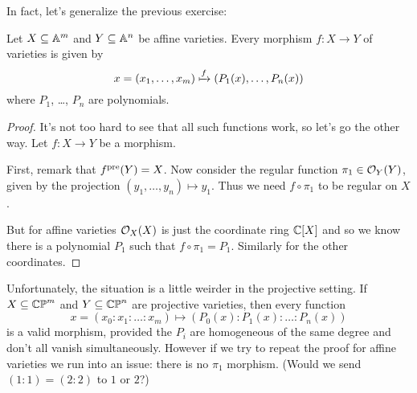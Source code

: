 In fact, let's generalize the previous exercise:
\begin{theorem}
	Let $X \subseteq \mathbb A^m$ and $Y \subseteq \mathbb A^n$ be affine varieties.
	Every morphism $f : X \to Y$ of varieties is given by
	\[
		x = \left( x_1, \dots, x_m \right)
		\xmapsto{f} \left( P_1(x), \dots, P_n(x) \right)
	\]
	where $P_1$, \dots, $P_n$ are polynomials.
	\label{thm:affine_global_polynomial}
\end{theorem}
\begin{proof}
	It's not too hard to see that all such functions work,
	so let's go the other way.
	Let $f : X \to Y$ be a morphism.

	First, remark that $f^{\text{pre}}(Y) = X$.
	Now consider the regular function $\pi_1 \in \mathcal O_Y(Y)$,
	given by the projection $(y_1, \dots, y_n) \mapsto y_1$.
	Thus we need $f \circ \pi_1$ to be regular on $X$.

	But for affine varieties $\mathcal O_X(X)$ is just the coordinate ring $\mathbb C[X]$
	and so we know there is a polynomial $P_1$ such that $f \circ \pi_1 = P_1$.
	Similarly for the other coordinates.
\end{proof}
Unfortunately, the situation is a little weirder in the projective setting.
If $X \subseteq \mathbb{CP}^m$ and $Y \subseteq \mathbb{CP}^n$ are projective varieties,
then every function
\[
	x = \left( x_0 : x_1 : \dots : x_m \right)
	\mapsto \left( P_0(x) : P_1(x) : \dots : P_n(x) \right)
\]
is a valid morphism, provided the $P_i$ are homogeneous
of the same degree and don't all vanish simultaneously.
However if we try to repeat the proof for affine varieties
we run into an issue: there is no $\pi_1$ morphism.
(Would we send $(1:1) = (2:2)$ to $1$ or $2$?)

